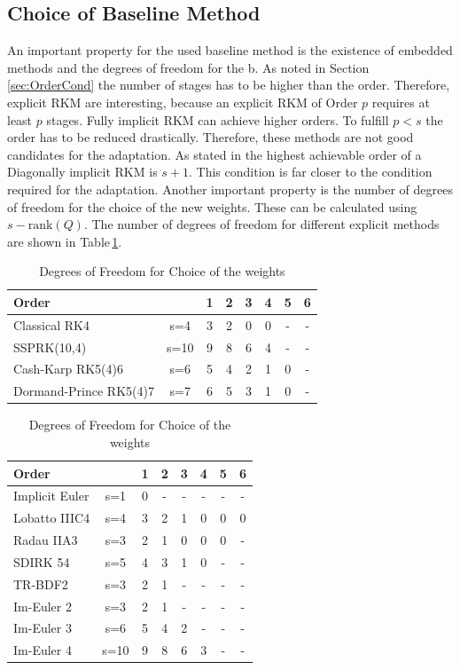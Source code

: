 \documentclass[a4paper]{article}
\numberwithin{equation}{section}
\theoremstyle{plain}
\theoremstyle{definition}
\numberwithin{theorem}{section}
\newcommand{\1}{\mathbbm{1}}
\begin{document}
\subsection{Choice of Baseline Method}
An important property for the used baseline method is the existence of embedded methods and the degrees of freedom for the b. 
As noted in Section\,\ref{sec:OrderCond} the number of stages has to be higher than the order.  
Therefore, explicit RKM are interesting, because an explicit RKM of Order $p$ requires at least $p$ stages. 
Fully implicit RKM can achieve higher orders.  
To fulfill $p<s$ the order has to be reduced drastically. Therefore, these methods are not good candidates for the adaptation. 
As stated in \cite{norsett_attainable_1977} the highest achievable order of a Diagonally implicit RKM is $s+1$. This condition is far closer to the condition required for the adaptation. 
Another important property is the number of degrees of freedom for the choice of the new weights.  
These can be calculated using $s-\mathrm{rank}(Q)$. %
The number of degrees of freedom for different explicit methods are shown in Table\,\ref{table:DOF_exp}. 
 
\begin{table}[h!]
\centering    %
\begin{tabular}{|l c|c c c c c c |} 
 \hline 
Order & &1&2&3&4&5&6 \\ 
 \hline Classical RK4& s=4&3&2&0&0& - & -  \\ 
 SSPRK(10,4)& s=10&9&8&6&4& - & -  \\ 
 Cash-Karp RK5(4)6& s=6&5&4&2&1&0& -  \\ 
 Dormand-Prince RK5(4)7& s=7&6&5&3&1&0& -  \\ 
 \hline 
 \end{tabular}
 \caption{Degrees of Freedom for Choice of the weights} %
 \label{table:DOF_exp}
 \end{table}
 
 \begin{table}[h!]
\centering   %
\begin{tabular}{|l c|c c c c c c |} 
 \hline 
Order & &1&2&3&4&5&6 \\ 
 \hline Implicit Euler& s=1&0& - & - & - & - & -  \\ 
 Lobatto IIIC4& s=4&3&2&1&0&0&0 \\ 
 Radau IIA3& s=3&2&1&0&0&0& -  \\ 
 SDIRK 54& s=5&4&3&1&0& - & -  \\ 
 TR-BDF2& s=3&2&1& - & - & - & -  \\ 
 Im-Euler 2& s=3&2&1& - & - & - & -  \\ 
 Im-Euler 3& s=6&5&4&2& - & - & -  \\ 
 Im-Euler 4& s=10&9&8&6&3& - & -  \\ 
 \hline 
 \end{tabular}
 \caption{Degrees of Freedom for Choice of the weights} %
 \label{table:DOF_imp}
 \end{table}
\end{document}
